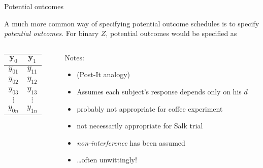 \begin{frame}{Potential outcomes}
  
A much more common way of specifying potential outcome schedules is to specify \textit{potential outcomes}.  For binary $Z$, potential outcomes would be specified as

\begin{columns}
\begin{Column}
    \begin{tabular}{cc} \hline
 $\mathbf{y}_0$ & $\mathbf{y}_1$ \\ \hline
$y_{01}$ & $y_{11}$  \\
$y_{02}$ & $y_{12}$  \\
$y_{03}$ & $y_{13}$  \\
$\vdots$ & $\vdots$  \\
$y_{0n}$ & $y_{1n}$  \\ \hline
    \end{tabular}
\pause
\end{Column}

\begin{Column}
Notes:\\

\begin{itemize}[<+->]
\item (Post-It analogy)
\item Assumes each subject's response depends only on his $d$
\item probably not appropriate for coffee experiment
\item not necessarily appropriate for Salk trial
\item \textit{non-interference} has been assumed
\item \ldots often unwittingly!
\end{itemize}
  
\end{Column}
\end{columns}

\end{frame}

